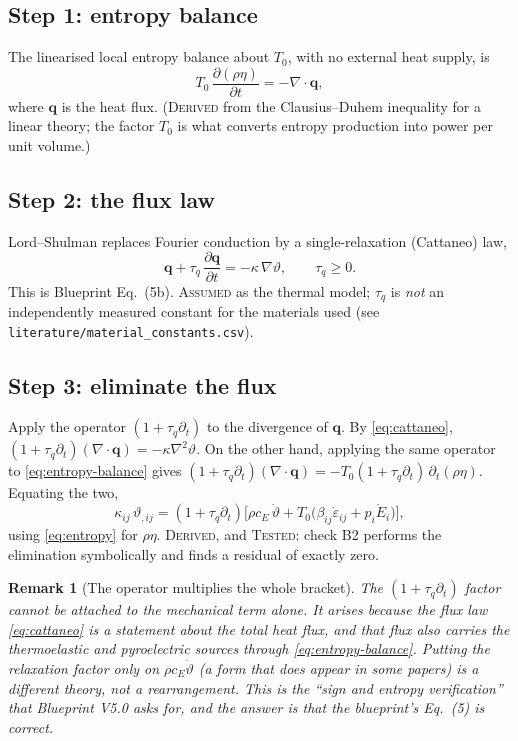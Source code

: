 \documentclass[11pt]{article}
\newcommand{\eps}{\varepsilon}
\newcommand{\bth}{\vartheta}
\newcommand{\bq}{\bm{q}}
\theoremstyle{plain}
\newtheorem{remark}{Remark}
\begin{document}
\subsection{Step 1: entropy balance}
The linearised local entropy balance about $T_0$, with no external heat supply, is
\begin{equation}
  T_0\,\frac{\partial(\rho\eta)}{\partial t} = -\nabla\cdot\bq,
  \label{eq:entropy-balance}
\end{equation}
where $\bq$ is the heat flux. (\textsc{Derived} from the Clausius--Duhem
inequality for a linear theory; the factor $T_0$ is what converts entropy
production into power per unit volume.)

\subsection{Step 2: the flux law}
Lord--Shulman replaces Fourier conduction by a single-relaxation (Cattaneo) law,
\begin{equation}
  \bq + \tau_q\,\frac{\partial\bq}{\partial t} = -\kappa\,\nabla\bth,
  \qquad \tau_q \ge 0 .
  \label{eq:cattaneo}
\end{equation}
This is Blueprint Eq.~(5b). \textsc{Assumed} as the thermal model; $\tau_q$ is
\emph{not} an independently measured constant for the materials used (see
\texttt{literature/material\_constants.csv}).

\subsection{Step 3: eliminate the flux}
Apply the operator $(1+\tau_q\partial_t)$ to the divergence of $\bq$. By
\eqref{eq:cattaneo}, $(1+\tau_q\partial_t)(\nabla\cdot\bq) = -\kappa\nabla^2\bth$.
On the other hand, applying the same operator to \eqref{eq:entropy-balance} gives
$(1+\tau_q\partial_t)(\nabla\cdot\bq) = -T_0(1+\tau_q\partial_t)\,\partial_t(\rho\eta)$.
Equating the two,
\begin{equation}
  \kappa_{ij}\,\bth_{,ij}
  = (1+\tau_q\partial_t)\Big[\rho c_E\,\dot\bth
    + T_0\big(\beta_{ij}\dot\eps_{ij} + p_i\dot E_i\big)\Big],
  \label{eq:ls}
\end{equation}
using \eqref{eq:entropy} for $\rho\eta$. \textsc{Derived}, and \textsc{Tested}:
check B2 performs the elimination symbolically and finds a residual of exactly
zero.

\begin{remark}[The operator multiplies the whole bracket]
\label{rem:bracket}
The $(1+\tau_q\partial_t)$ factor cannot be attached to the mechanical term alone.
It arises because the flux law \eqref{eq:cattaneo} is a statement about the
\emph{total} heat flux, and that flux also carries the thermoelastic and
pyroelectric sources through \eqref{eq:entropy-balance}. Putting the relaxation
factor only on $\rho c_E\dot\bth$ (a form that does appear in some papers) is a
different theory, not a rearrangement. This is the ``sign and entropy
verification'' that Blueprint V5.0 asks for, and the answer is that the blueprint's
Eq.~(5) is correct.
\end{remark}
\end{document}
